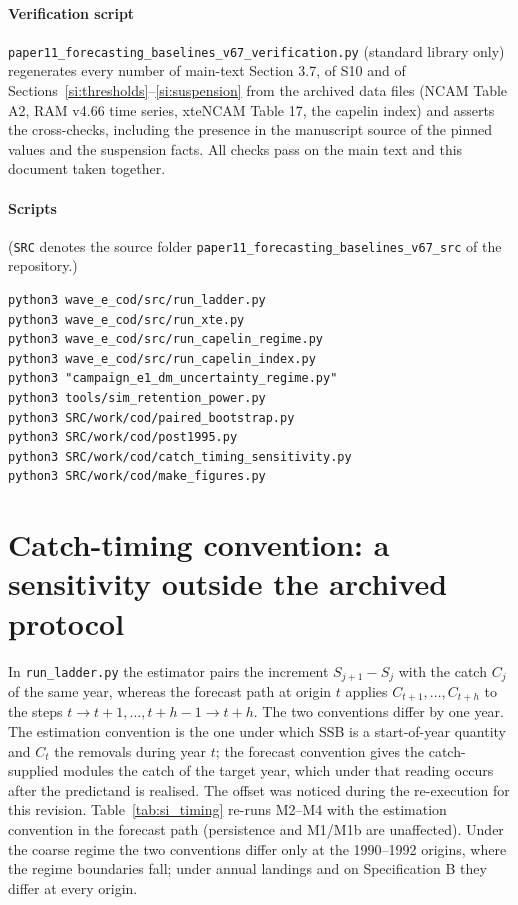 \documentclass[preprint,11pt,authoryear]{elsarticle}
\theoremstyle{remark}
\begin{document}
\paragraph{Verification script} \texttt{paper11\_forecasting\_\allowbreak{}baselines\_v67\_\allowbreak{}verification.py} (standard library only) regenerates every number of main-text Section 3.7, of S10 and of Sections~\ref{si:thresholds}--\ref{si:suspension} from the archived data files (NCAM Table A2, RAM v4.66 time series, xteNCAM Table 17, the capelin index) and asserts the cross-checks, including the presence in the manuscript source of the pinned values and the suspension facts. All checks pass on the main text and this document taken together.

\paragraph{Scripts} (\texttt{SRC} denotes the source folder \texttt{paper11\_forecasting\_\allowbreak{}baselines\_v67\_src} of the repository.)
{\footnotesize\begin{verbatim}
python3 wave_e_cod/src/run_ladder.py
python3 wave_e_cod/src/run_xte.py
python3 wave_e_cod/src/run_capelin_regime.py
python3 wave_e_cod/src/run_capelin_index.py
python3 "campaign_e1_dm_uncertainty_regime.py"
python3 tools/sim_retention_power.py
python3 SRC/work/cod/paired_bootstrap.py
python3 SRC/work/cod/post1995.py
python3 SRC/work/cod/catch_timing_sensitivity.py
python3 SRC/work/cod/make_figures.py
\end{verbatim}}

\FloatBarrier
\section{Catch-timing convention: a sensitivity outside the archived protocol}\label{si:timing}

In \texttt{run\_ladder.py} the estimator pairs the increment $S_{j+1}-S_j$ with the catch $C_j$ of the same year, whereas the forecast path at origin $t$ applies $C_{t+1},\dots,C_{t+h}$ to the steps $t\to t+1,\dots,t+h-1\to t+h$. The two conventions differ by one year. The estimation convention is the one under which SSB is a start-of-year quantity and $C_t$ the removals during year $t$; the forecast convention gives the catch-supplied modules the catch of the target year, which under that reading occurs after the predictand is realised. The offset was noticed during the re-execution for this revision. Table~\ref{tab:si_timing} re-runs M2--M4 with the estimation convention in the forecast path (persistence and M1/M1b are unaffected). Under the coarse regime the two conventions differ only at the 1990--1992 origins, where the regime boundaries fall; under annual landings and on Specification B they differ at every origin.
\end{document}
